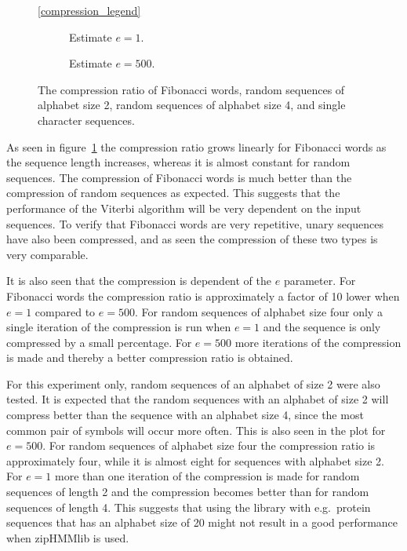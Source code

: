 \begin{figure}
  \centering\ref{compression_legend}
  \begin{subfigure}[b]{0.5\textwidth}
    \centering 
    \caption{Estimate $e = 1$.}
  \end{subfigure}\hspace{-5mm}%
  \begin{subfigure}[b]{0.5\textwidth}
    \centering 
    \caption{Estimate $e = 500$.}
  \end{subfigure}
  \caption{The compression ratio of Fibonacci words, random sequences of
    alphabet size 2, random sequences of alphabet size 4, and single character
    sequences.}
  \label{fig:compression_ratio}
\end{figure}

As seen in figure~\ref{fig:compression_ratio} the compression ratio grows
linearly for Fibonacci words as the sequence length increases, whereas it
is almost constant for random sequences. The compression of Fibonacci
words is much better than the compression of random sequences as
expected. This suggests that the performance of the Viterbi algorithm will be
very dependent on the input sequences. To verify that Fibonacci words
are very repetitive, unary sequences have also been compressed, and as seen the
compression of these two types is very comparable.

It is also seen that the compression is dependent of the $e$ parameter.
For Fibonacci words the compression ratio is approximately a factor of 10 lower when
$e = 1$ compared to $e = 500$. For random sequences of alphabet size four only
a single iteration of the compression is run when $e = 1$ and the sequence is
only compressed by a small percentage. For $e = 500$ more iterations of the
compression is made and thereby a better compression ratio is obtained.

For this experiment only, random sequences of an alphabet of size 2 were also
tested. It is expected that the random sequences with an alphabet of size 2
will compress better than the sequence with an alphabet size 4, since the most
common pair of symbols will occur more often. This is also seen in
the plot for $e = 500$. For random sequences of alphabet size four the
compression ratio is approximately four, while it is almost eight for sequences
with alphabet size 2. For $e = 1$ more than one iteration of the compression is
made for random sequences of length 2 and the compression becomes better than
for random sequences of length 4. This suggests that using the library with
e.g.\ protein sequences that has an alphabet size of 20 might not result in a
good performance when zipHMMlib is used.

